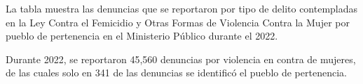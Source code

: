 \justifying La tabla muestra las denuncias que se reportaron por tipo de delito contempladas en la Ley Contra el Femicidio y Otras Formas de Violencia Contra la Mujer por pueblo de pertenencia en el Ministerio Público durante el 2022. 

Durante 2022, se reportaron 45,560 denuncias por violencia en contra de mujeres, de las cuales solo en 341 de las denuncias se identificó el pueblo de pertenencia.
